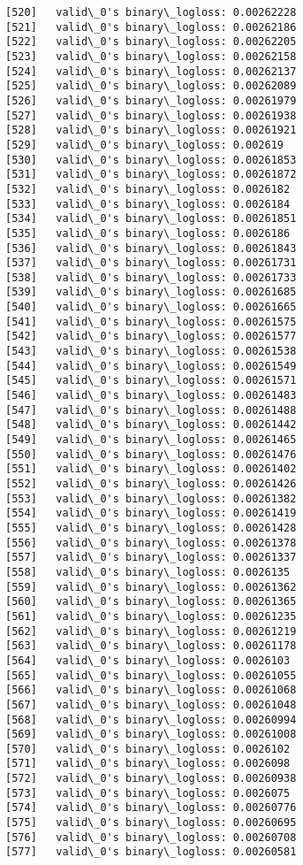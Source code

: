 \documentclass[11pt]{article}
\begin{document}
\begin{Verbatim}[commandchars=\\\{\}]
[520]	valid\_0's binary\_logloss: 0.00262228
[521]	valid\_0's binary\_logloss: 0.00262186
[522]	valid\_0's binary\_logloss: 0.00262205
[523]	valid\_0's binary\_logloss: 0.00262158
[524]	valid\_0's binary\_logloss: 0.00262137
[525]	valid\_0's binary\_logloss: 0.00262089
[526]	valid\_0's binary\_logloss: 0.00261979
[527]	valid\_0's binary\_logloss: 0.00261938
[528]	valid\_0's binary\_logloss: 0.00261921
[529]	valid\_0's binary\_logloss: 0.002619
[530]	valid\_0's binary\_logloss: 0.00261853
[531]	valid\_0's binary\_logloss: 0.00261872
[532]	valid\_0's binary\_logloss: 0.0026182
[533]	valid\_0's binary\_logloss: 0.0026184
[534]	valid\_0's binary\_logloss: 0.00261851
[535]	valid\_0's binary\_logloss: 0.0026186
[536]	valid\_0's binary\_logloss: 0.00261843
[537]	valid\_0's binary\_logloss: 0.00261731
[538]	valid\_0's binary\_logloss: 0.00261733
[539]	valid\_0's binary\_logloss: 0.00261685
[540]	valid\_0's binary\_logloss: 0.00261665
[541]	valid\_0's binary\_logloss: 0.00261575
[542]	valid\_0's binary\_logloss: 0.00261577
[543]	valid\_0's binary\_logloss: 0.00261538
[544]	valid\_0's binary\_logloss: 0.00261549
[545]	valid\_0's binary\_logloss: 0.00261571
[546]	valid\_0's binary\_logloss: 0.00261483
[547]	valid\_0's binary\_logloss: 0.00261488
[548]	valid\_0's binary\_logloss: 0.00261442
[549]	valid\_0's binary\_logloss: 0.00261465
[550]	valid\_0's binary\_logloss: 0.00261476
[551]	valid\_0's binary\_logloss: 0.00261402
[552]	valid\_0's binary\_logloss: 0.00261426
[553]	valid\_0's binary\_logloss: 0.00261382
[554]	valid\_0's binary\_logloss: 0.00261419
[555]	valid\_0's binary\_logloss: 0.00261428
[556]	valid\_0's binary\_logloss: 0.00261378
[557]	valid\_0's binary\_logloss: 0.00261337
[558]	valid\_0's binary\_logloss: 0.0026135
[559]	valid\_0's binary\_logloss: 0.00261362
[560]	valid\_0's binary\_logloss: 0.00261365
[561]	valid\_0's binary\_logloss: 0.00261235
[562]	valid\_0's binary\_logloss: 0.00261219
[563]	valid\_0's binary\_logloss: 0.00261178
[564]	valid\_0's binary\_logloss: 0.0026103
[565]	valid\_0's binary\_logloss: 0.00261055
[566]	valid\_0's binary\_logloss: 0.00261068
[567]	valid\_0's binary\_logloss: 0.00261048
[568]	valid\_0's binary\_logloss: 0.00260994
[569]	valid\_0's binary\_logloss: 0.00261008
[570]	valid\_0's binary\_logloss: 0.0026102
[571]	valid\_0's binary\_logloss: 0.0026098
[572]	valid\_0's binary\_logloss: 0.00260938
[573]	valid\_0's binary\_logloss: 0.0026075
[574]	valid\_0's binary\_logloss: 0.00260776
[575]	valid\_0's binary\_logloss: 0.00260695
[576]	valid\_0's binary\_logloss: 0.00260708
[577]	valid\_0's binary\_logloss: 0.00260581

\end{Verbatim}
\end{document}
